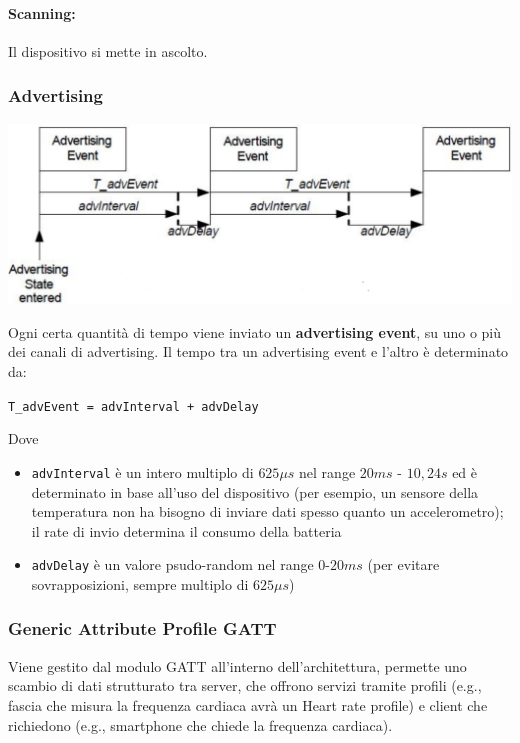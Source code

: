 \paragraph{Scanning:} Il dispositivo si mette in ascolto.

\subsubsection{Advertising}
\begin{center}
	\includegraphics[width=0.85\linewidth]{img/wpan/bleadvert}
\end{center}

Ogni certa quantità di tempo viene inviato un \textbf{advertising event}, su uno o più dei canali di advertising. Il tempo tra un advertising event e l'altro è determinato da:
\begin{center}
	\texttt{T\_advEvent = advInterval + advDelay}
\end{center}
Dove
\begin{itemize}
	\item \texttt{advInterval} è un intero multiplo di $625 \mu s$ nel range $20 ms$ - $10,24s$ ed è determinato in base all'uso del dispositivo (per esempio, un sensore della temperatura non ha bisogno di inviare dati spesso quanto un accelerometro); il rate di invio determina il consumo della batteria
	
    \item \texttt{advDelay} è un valore psudo-random nel range $0$-$20ms$ (per evitare sovrapposizioni, sempre multiplo di $625 \mu s$)
\end{itemize}

\subsubsection{Generic Attribute Profile GATT}

Viene gestito dal modulo GATT all'interno dell'architettura, permette uno scambio di dati strutturato tra server, che offrono servizi tramite profili (e.g., fascia che misura la frequenza cardiaca avrà un Heart rate profile) e client che richiedono (e.g., smartphone che chiede la frequenza cardiaca). 

